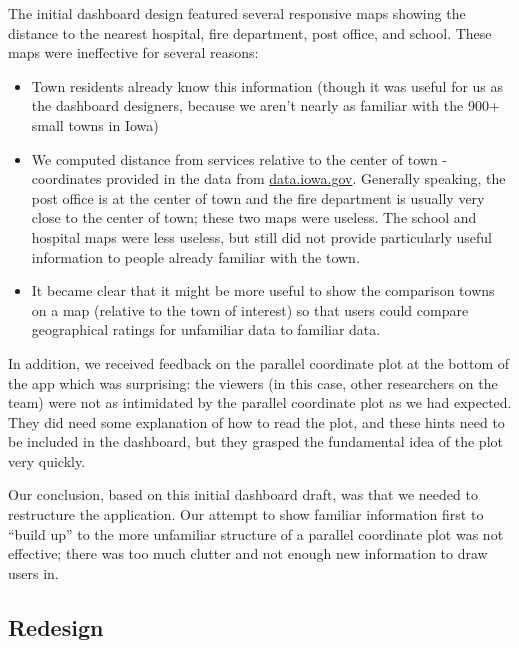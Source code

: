 \documentclass[print]{nuthesis}
\providecommand{\tightlist}{%
  \setlength{\itemsep}{0pt}\setlength{\parskip}{0pt}}
\begin{document}
The initial dashboard design featured several responsive maps showing the distance to the nearest hospital, fire department, post office, and school. These maps were ineffective for several reasons:

\begin{itemize}
\tightlist
\item
  Town residents already know this information (though it was useful for us as the dashboard designers, because we aren't nearly as familiar with the 900+ small towns in Iowa)
\item
  We computed distance from services relative to the center of town - coordinates provided in the data from \url{data.iowa.gov}. Generally speaking, the post office is at the center of town and the fire department is usually very close to the center of town; these two maps were useless. The school and hospital maps were less useless, but still did not provide particularly useful information to people already familiar with the town.
\item
  It became clear that it might be more useful to show the comparison towns on a map (relative to the town of interest) so that users could compare geographical ratings for unfamiliar data to familiar data.
\end{itemize}

In addition, we received feedback on the parallel coordinate plot at the bottom of the app which was surprising: the viewers (in this case, other researchers on the team) were not as intimidated by the parallel coordinate plot as we had expected. They did need some explanation of how to read the plot, and these hints need to be included in the dashboard, but they grasped the fundamental idea of the plot very quickly.

Our conclusion, based on this initial dashboard draft, was that we needed to restructure the application. Our attempt to show familiar information first to ``build up'' to the more unfamiliar structure of a parallel coordinate plot was not effective; there was too much clutter and not enough new information to draw users in.

\subsection{ Redesign }
\end{document}
